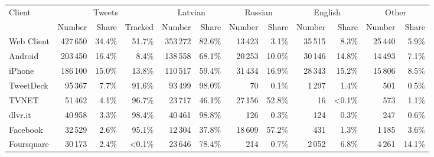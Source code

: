 \begin{tabular}{lrrrrrrrrrrr}
\toprule
\multirow{2}{*}{Client} & \multicolumn{3}{c}{Tweets} & \multicolumn{2}{c}{Latvian} & \multicolumn{2}{c}{Russian} & \multicolumn{2}{c}{English} & \multicolumn{2}{c}{Other} \\
\cmidrule(r){2-4} \cmidrule(r){5-6} \cmidrule(r){7-8} \cmidrule(r){9-10} \cmidrule(r){11-12}
{} &  Number & Share & Tracked & Number & Share & Number & Share & Number & Share & Number & Share \\
\midrule
Web Client  &              427\,650 &       34.4\% &                51.7\% &            353\,272 &             82.6\% &             13\,423 &              3.1\% &             35\,515 &              8.3\% &            25\,440 &             5.9\% \\
Android     &              203\,450 &       16.4\% &                 8.4\% &            138\,558 &             68.1\% &             20\,253 &             10.0\% &             30\,146 &             14.8\% &            14\,493 &             7.1\% \\
iPhone      &              186\,100 &       15.0\% &                13.8\% &            110\,517 &             59.4\% &             31\,434 &             16.9\% &             28\,343 &             15.2\% &            15\,806 &             8.5\% \\
TweetDeck           &       95\,367 &        7.7\% &                91.6\% &             93\,499 &             98.0\% &                  70 &              0.1\% &              1\,297 &              1.4\% &                501 &             0.5\% \\
TVNET               &       51\,462 &        4.1\% &                96.7\% &             23\,717 &             46.1\% &             27\,156 &             52.8\% &                  16 &             <0.1\% &                573 &             1.1\% \\
dlvr.it             &       40\,958 &        3.3\% &                98.4\% &             40\,461 &             98.8\% &                 126 &              0.3\% &                 124 &              0.3\% &                247 &             0.6\% \\
Facebook            &       32\,529 &        2.6\% &                95.1\% &             12\,304 &             37.8\% &             18\,609 &             57.2\% &                 431 &              1.3\% &             1\,185 &             3.6\% \\
Foursquare          &       30\,173 &        2.4\% &                <0.1\% &             23\,646 &             78.4\% &                 214 &              0.7\% &              2\,052 &              6.8\% &             4\,261 &            14.1\% \\

\end{tabular}
